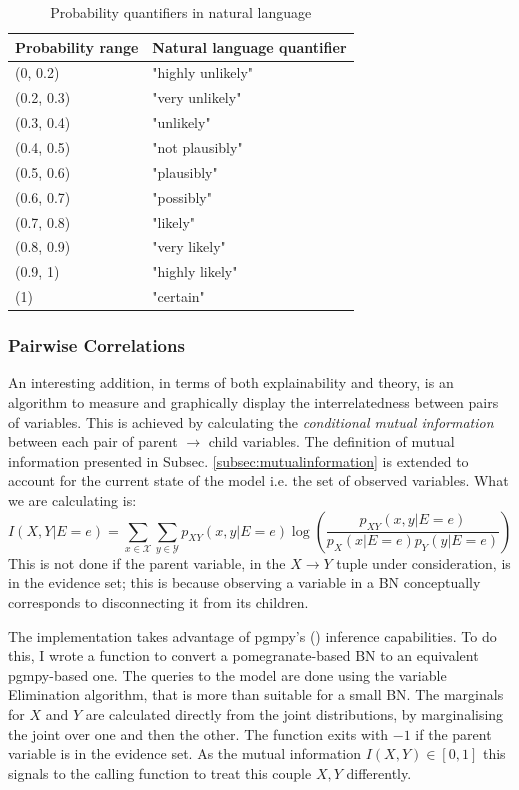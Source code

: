 \begin{table}[htbp]
\caption{Probability quantifiers in natural language}
\begin{tabularx}{\textwidth}{@{} X X @{}}
\toprule 
Probability range & Natural language quantifier \\
\midrule 
(0, 0.2) &  "highly unlikely" \\
(0.2, 0.3) & "very unlikely" \\
(0.3, 0.4) & "unlikely" \\
(0.4, 0.5) & "not plausibly" \\
(0.5, 0.6) & "plausibly" \\
(0.6, 0.7) & "possibly" \\
(0.7, 0.8) & "likely" \\
(0.8, 0.9) & "very likely" \\
(0.9, 1) &  "highly likely" \\
(1) &  "certain" \\
\bottomrule
\end{tabularx}
\label{tab:naturallanguageprobabilities}
\end{table}


\subsubsection{Pairwise Correlations}
An interesting addition, in terms of both explainability and theory, is an algorithm to measure and graphically display the interrelatedness between pairs of variables.
This is achieved by calculating the \textit{conditional mutual information}  between each pair of parent $\rightarrow$ child variables.
The definition of mutual information presented in Subsec. \ref{subsec:mutualinformation} is extended to account for the current state of the model i.e. the set of observed variables.
What we are calculating is:
\begin{equation}
	I(X,Y|E=e) = \sum_{x \in \mathcal{X}} \sum_{y \in \mathcal{Y}} p_{XY}(x,y|E=e) \log \left( \frac{p_{XY}(x, y|E=e)}{p_{X}(x|E=e) p_{Y}(y|E=e)} \right)
\end{equation}
This is not done if the parent variable, in the $X \rightarrow Y$ tuple under consideration, is in the evidence set; this is because observing a variable in a BN conceptually corresponds to disconnecting it from its children.

The implementation takes advantage of pgmpy's (\cite{pgmpy}) inference capabilities. 
To do this, I wrote a function to convert a pomegranate-based BN to an equivalent pgmpy-based one.
The queries to the model are done using the variable Elimination algorithm, that is more than suitable for a small BN.
The marginals for $X$ and $Y$ are calculated directly from the joint distributions, by marginalising the joint over one and then the other.
The function exits with $-1$ if the parent variable is in the evidence set.
As the mutual information $I(X,Y) \in [0,1]$ this signals to the calling function to treat this couple $X,Y$ differently.

